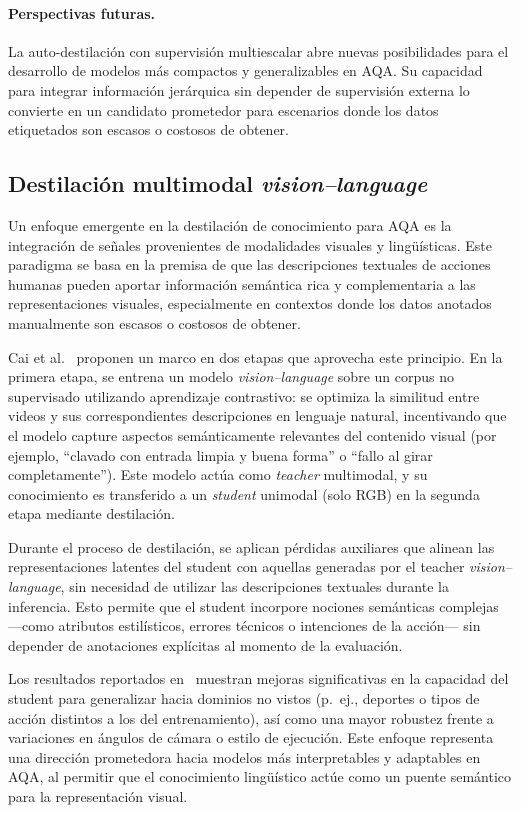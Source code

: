 \paragraph{Perspectivas futuras.} La auto-destilación con supervisión multiescalar abre nuevas posibilidades para el desarrollo de modelos más compactos y generalizables en AQA. Su capacidad para integrar información jerárquica sin depender de supervisión externa lo convierte en un candidato prometedor para escenarios donde los datos etiquetados son escasos o costosos de obtener.


\subsection{Destilación multimodal \textit{vision--language}}

Un enfoque emergente en la destilación de conocimiento para AQA es la integración de señales provenientes de modalidades visuales y lingüísticas. Este paradigma se basa en la premisa de que las descripciones textuales de acciones humanas pueden aportar información semántica rica y complementaria a las representaciones visuales, especialmente en contextos donde los datos anotados manualmente son escasos o costosos de obtener.

Cai et al.~\cite{Cai2023VisionLanguageAQA} proponen un marco en dos etapas que aprovecha este principio. En la primera etapa, se entrena un modelo \textit{vision--language} sobre un corpus no supervisado utilizando aprendizaje contrastivo: se optimiza la similitud entre videos y sus correspondientes descripciones en lenguaje natural, incentivando que el modelo capture aspectos semánticamente relevantes del contenido visual (por ejemplo, ``clavado con entrada limpia y buena forma'' o ``fallo al girar completamente''). Este modelo actúa como \textit{teacher} multimodal, y su conocimiento es transferido a un \textit{student} unimodal (solo RGB) en la segunda etapa mediante destilación.

Durante el proceso de destilación, se aplican pérdidas auxiliares que alinean las representaciones latentes del student con aquellas generadas por el teacher \textit{vision--language}, sin necesidad de utilizar las descripciones textuales durante la inferencia. Esto permite que el student incorpore nociones semánticas complejas —como atributos estilísticos, errores técnicos o intenciones de la acción— sin depender de anotaciones explícitas al momento de la evaluación.

Los resultados reportados en~\cite{Cai2023VisionLanguageAQA} muestran mejoras significativas en la capacidad del student para generalizar hacia dominios no vistos (p.~ej., deportes o tipos de acción distintos a los del entrenamiento), así como una mayor robustez frente a variaciones en ángulos de cámara o estilo de ejecución. Este enfoque representa una dirección prometedora hacia modelos más interpretables y adaptables en AQA, al permitir que el conocimiento lingüístico actúe como un puente semántico para la representación visual.

